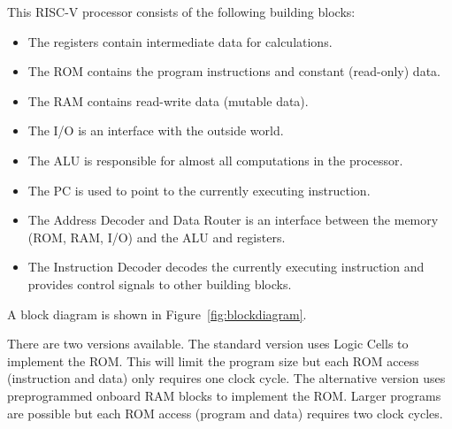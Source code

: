 \documentclass[12pt]{article}
\begin{document}
This RISC-V processor consists of the following building blocks:

\begin{itemize}
\item The registers contain intermediate data for calculations.
\item The ROM contains the program instructions and constant (read-only) data.
\item The RAM contains read-write data (mutable data).
\item The I/O is an interface with the outside world.
\item The ALU is responsible for almost all computations in the processor.
\item The PC is used to point to the currently executing instruction.
\item The Address Decoder and Data Router is an interface between the memory (ROM, RAM, I/O) and the ALU and registers.
\item The Instruction Decoder decodes the currently executing instruction and provides control signals to other building blocks.
\end{itemize}

A block diagram is shown in Figure~\ref{fig:blockdiagram}.

There are two versions available. The standard version uses Logic Cells to implement the ROM. This will limit the program size but each ROM access (instruction and data) only requires one clock cycle. The alternative version uses preprogrammed onboard RAM blocks to implement the ROM. Larger programs are possible but each ROM access (program and data) requires two clock cycles.
 
\end{document}
